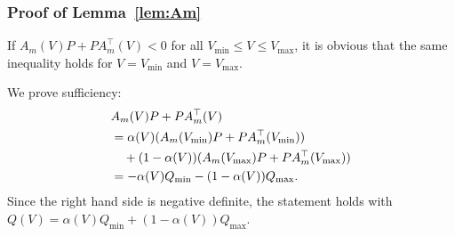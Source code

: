 \documentclass[letterpaper, 10 pt, conference]{ieeeconf}
\begin{document}
\subsubsection{Proof of Lemma~\ref{lem:Am}}
If $A_m(V) P + P A_m^\top(V)<0$ for all $V_{\min} \leq V \leq V_{\max}$, it is obvious that the same inequality holds for $V=V_{\min}$ and $V = V_{\max}$.

We prove sufficiency:
\begin{align*}
    &A_m(V) P + P A_m^\top(V) \nonumber\\
    &= \alpha(V) (A_m(V_{\min}) P + P A_m^\top(V_{\min}))
    \nonumber\\
    &\quad +(1-\alpha(V))(A_m(V_{\max}) P + PA_m^\top(V_{\max})) \nonumber\\
    &= -\alpha(V) Q_{\min} - (1-\alpha(V))Q_{\max}.
\end{align*}
Since the right hand side is negative definite, the statement holds with $Q(V)=\alpha(V) Q_{\min} + (1-\alpha(V))Q_{\max}$.\oprocend\\
\end{document}
